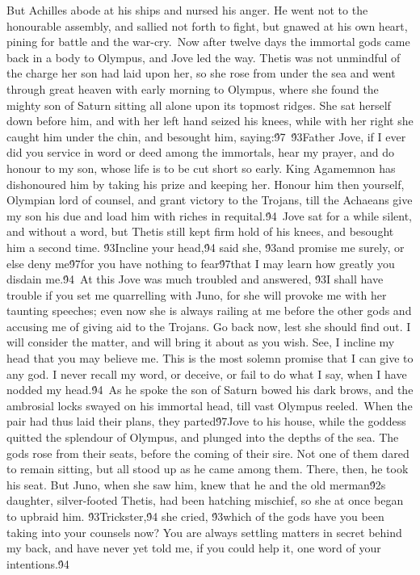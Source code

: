 {But Achilles abode at his ships and nursed his anger. He went not to the honourable assembly, and sallied not forth to fight, but gnawed at his own heart, pining for battle and the war-cry.\
Now after twelve days the immortal gods came back in a body to Olympus, and Jove led the way. Thetis was not unmindful of the charge her son had laid upon her, so she rose from under the sea and went through great heaven with early morning to Olympus, where she found the mighty son of Saturn sitting all alone upon its topmost ridges. She sat herself down before him, and with her left hand seized his knees, while with her right she caught him under the chin, and besought him, saying:\'97\
\'93Father Jove, if I ever did you service in word or deed among the immortals, hear my prayer, and do honour to my son, whose life is to be cut short so early. King Agamemnon has dishonoured him by taking his prize and keeping her. Honour him then yourself, Olympian lord of counsel, and grant victory to the Trojans, till the Achaeans give my son his due and load him with riches in requital.\'94\
Jove sat for a while silent, and without a word, but Thetis still kept firm hold of his knees, and besought him a second time. \'93Incline your head,\'94 said she, \'93and promise me surely, or else deny me\'97for you have nothing to fear\'97that I may learn how greatly you disdain me.\'94\
At this Jove was much troubled and answered, \'93I shall have trouble if you set me quarrelling with Juno, for she will provoke me with her taunting speeches; even now she is always railing at me before the other gods and accusing me of giving aid to the Trojans. Go back now, lest she should find out. I will consider the matter, and will bring it about as you wish. See, I incline my head that you may believe me. This is the most solemn promise that I can give to any god. I never recall my word, or deceive, or fail to do what I say, when I have nodded my head.\'94\
As he spoke the son of Saturn bowed his dark brows, and the ambrosial locks swayed on his immortal head, till vast Olympus reeled.\
When the pair had thus laid their plans, they parted\'97Jove to his house, while the goddess quitted the splendour of Olympus, and plunged into the depths of the sea. The gods rose from their seats, before the coming of their sire. Not one of them dared to remain sitting, but all stood up as he came among them. There, then, he took his seat. But Juno, when she saw him, knew that he and the old merman\'92s daughter, silver-footed Thetis, had been hatching mischief, so she at once began to upbraid him. \'93Trickster,\'94 she cried, \'93which of the gods have you been taking into your counsels now? You are always settling matters in secret behind my back, and have never yet told me, if you could help it, one word of your intentions.\'94\
}
